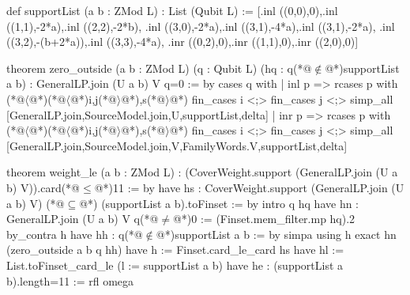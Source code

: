 def supportList (a b : ZMod L) : List (Qubit L) :=
  [.inl ((0,0),0),.inl ((1,1),-2*a),.inl ((2,2),-2*b),
   .inl ((3,0),-2*a),.inl ((3,1),-4*a),.inl ((3,1),-2*a),
   .inl ((3,2),-(b+2*a)),.inl ((3,3),-4*a),
   .inr ((0,2),0),.inr ((1,1),0),.inr ((2,0),0)]

theorem zero_outside (a b : ZMod L) (q : Qubit L) (hq : q(*@$\notin$@*)supportList a b) :
    GeneralLP.join (U a b) V q=0 := by
  cases q with
  | inl p =>
    rcases p with (*@$\langle$@*)(*@$\langle$@*)i,j(*@$\rangle$@*),s(*@$\rangle$@*)
    fin_cases i <;> fin_cases j <;>
      simp_all [GeneralLP.join,SourceModel.join,U,supportList,delta]
  | inr p =>
    rcases p with (*@$\langle$@*)(*@$\langle$@*)i,j(*@$\rangle$@*),s(*@$\rangle$@*)
    fin_cases i <;> fin_cases j <;>
      simp_all [GeneralLP.join,SourceModel.join,V,FamilyWords.V,supportList,delta]

theorem weight_le (a b : ZMod L) :
    (CoverWeight.support (GeneralLP.join (U a b) V)).card(*@$\le$@*)11 := by
  have hs : CoverWeight.support (GeneralLP.join (U a b) V) (*@$\subseteq$@*) (supportList a b).toFinset := by
    intro q hq
    have hn : GeneralLP.join (U a b) V q(*@$\ne$@*)0 := (Finset.mem_filter.mp hq).2
    by_contra h
    have hh : q(*@$\notin$@*)supportList a b := by simpa using h
    exact hn (zero_outside a b q hh)
  have h := Finset.card_le_card hs
  have hl := List.toFinset_card_le (l := supportList a b)
  have he : (supportList a b).length=11 := rfl
  omega
